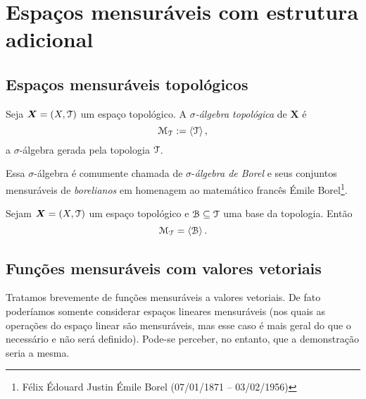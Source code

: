 \clearpage
\section{Espaços mensuráveis com estrutura adicional}

\subsection{Espaços mensuráveis topológicos}

\begin{definition}
Seja $\bm X=(X,\mathcal{T})$ um espaço topológico. A \emph{$\sigma$-álgebra topológica} de $\bm X$ é
	\begin{equation*}
	\mathcal{M}_{\mathcal{T}} := \left\langle \mathcal{T} \right\rangle,
	\end{equation*}
a $\sigma$-álgebra gerada pela topologia $\mathcal{T}$.
\end{definition}

Essa $\sigma$-álgebra é comumente chamada de $\sigma$-\emph{álgebra de Borel} e seus conjuntos mensuráveis de \emph{borelianos} em homenagem ao matemático francês Émile Borel\footnote{Félix Édouard Justin Émile Borel (07/01/1871 – 03/02/1956)}.

\begin{proposition}
Sejam $\bm X=(X,\mathcal{T})$ um espaço topológico e $\mathcal{B} \subseteq \mathcal{T}$ uma base da topologia. Então
	\begin{equation*}
	\mathcal{M}_{\mathcal{T}} = \left\langle \mathcal B \right\rangle.
	\end{equation*}
\end{proposition}


\subsection{Funções mensuráveis com valores vetoriais}

Tratamos brevemente de funções mensuráveis a valores vetoriais. De fato poderíamos somente considerar espaços lineares mensuráveis (nos quais as operações do espaço linear são mensuráveis, mas esse caso é mais geral do que o necessário e não será definido). Pode-se perceber, no entanto, que a demonstração seria a mesma.

